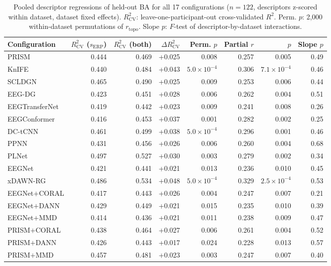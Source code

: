 \begin{table}[H]
\centering
\caption{Pooled descriptor regressions of held-out BA for all 17 configurations ($n=122$, descriptors z-scored within dataset, dataset fixed effects). $R^2_\mathrm{CV}$: leave-one-participant-out cross-validated $R^2$. Perm. $p$: 2{,}000 within-dataset permutations of $r_\mathrm{topo}$. Slope $p$: $F$-test of descriptor-by-dataset interactions.}
\label{tab:supp-regressions}
\scriptsize
\begin{adjustbox}{max width=\textwidth}
\begin{tabular}{@{}lrrrrrrr@{}}
\toprule
Configuration & $R^2_\mathrm{CV}$ ($s_\mathrm{ERP}$) & $R^2_\mathrm{CV}$ (both) & $\Delta R^2_\mathrm{CV}$ & Perm. $p$ & Partial $r$ & $p$ & Slope $p$ \\
\midrule
PRISM & 0.444 & 0.469 & +0.025 & 0.008 & 0.257 & 0.005 & 0.49 \\
KnIFE & 0.440 & 0.484 & +0.043 & $5.0\times10^{-4}$ & 0.306 & $7.1\times10^{-4}$ & 0.46 \\
SCLDGN & 0.465 & 0.490 & +0.025 & 0.009 & 0.253 & 0.006 & 0.44 \\
EEG-DG & 0.423 & 0.451 & +0.028 & 0.006 & 0.262 & 0.004 & 0.51 \\
EEGTransferNet & 0.419 & 0.442 & +0.023 & 0.009 & 0.241 & 0.008 & 0.26 \\
EEGConformer & 0.416 & 0.453 & +0.037 & 0.001 & 0.282 & 0.002 & 0.25 \\
DC-tCNN & 0.461 & 0.499 & +0.038 & $5.0\times10^{-4}$ & 0.296 & 0.001 & 0.46 \\
PPNN & 0.431 & 0.456 & +0.026 & 0.006 & 0.260 & 0.004 & 0.68 \\
PLNet & 0.497 & 0.527 & +0.030 & 0.003 & 0.279 & 0.002 & 0.34 \\
EEGNet & 0.421 & 0.441 & +0.021 & 0.013 & 0.236 & 0.010 & 0.45 \\
xDAWN-RG & 0.486 & 0.534 & +0.048 & $5.0\times10^{-4}$ & 0.329 & $2.5\times10^{-4}$ & 0.53 \\
\midrule
EEGNet$+$CORAL & 0.417 & 0.443 & +0.026 & 0.004 & 0.247 & 0.007 & 0.21 \\
EEGNet$+$DANN & 0.429 & 0.449 & +0.021 & 0.015 & 0.235 & 0.010 & 0.39 \\
EEGNet$+$MMD & 0.414 & 0.436 & +0.021 & 0.011 & 0.238 & 0.009 & 0.47 \\
PRISM$+$CORAL & 0.438 & 0.464 & +0.027 & 0.006 & 0.261 & 0.004 & 0.52 \\
PRISM$+$DANN & 0.426 & 0.443 & +0.017 & 0.024 & 0.228 & 0.013 & 0.57 \\
PRISM$+$MMD & 0.457 & 0.481 & +0.023 & 0.003 & 0.247 & 0.007 & 0.40 \\
\bottomrule
\end{tabular}
\end{adjustbox}
\end{table}
